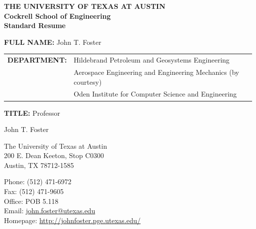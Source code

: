 \documentclass[12pt,letterpaper]{article}
\makeatletter
\let\saved@bibitem\@bibitem %
\def\HCode#1{}
\def\name{John T. Foster}
\makeatother
\begin{document}
\sloppy

\begingroup
\makeatletter
\let\@bibitem\saved@bibitem %
\endgroup

\ifdefined\iscockrell
\begin{center}
    \textbf{THE UNIVERSITY OF TEXAS AT AUSTIN \\ Cockrell School of Engineering \\ Standard Resume}
\end{center}

\bigskip

\begin{minipage}[t]{0.7\textwidth}
    \textbf{\large FULL NAME:} John T. Foster \\

    \begin{tabular}{@{}ll}
        \textbf{\large DEPARTMENT:} & Hildebrand Petroleum and Geosystems Engineering \\
        & Aerospace Engineering and Engineering Mechanics (by courtesy) \\
        & Oden Institute for Computer Science and Engineering
    \end{tabular}
\end{minipage}
\begin{minipage}[t]{0.3\textwidth}
    \textbf{\large TITLE:} Professor
\end{minipage}
\else
\HCode{<div class="fluid-container"}

\HCode{<div class="row">}
\HCode{<div class="col-md-12">}
\HCode{<h1>}
{\huge \name}
\HCode{</h1>}
\HCode{</div>} %
\HCode{</div>} %

\bigskip

\HCode{<div class="row">}
\HCode{<div class="col-md-4">}
\begin{minipage}[t]{0.5\textwidth}
  The University of Texas at Austin \\
  200 E. Dean Keeton, Stop C0300 \\
  Austin, TX 78712-1585 \\
\end{minipage}
\HCode{</div>} %
\HCode{<div class="col-md-8">}
\begin{minipage}[t]{0.5\textwidth}
  Phone: (512) 471-6972 \\
  Fax: (512) 471-9605 \\
  Office: POB 5.118 \\
\ifdefined\ispdf
  Email: \href{mailto:john.foster@utexas.edu}{john.foster@utexas.edu} \\
\fi
  Homepage: \href{http://johnfoster.pge.utexas.edu/}{http://johnfoster.pge.utexas.edu/}
\end{minipage}
\HCode{</div>} %
\HCode{</div>} %
\end{document}
